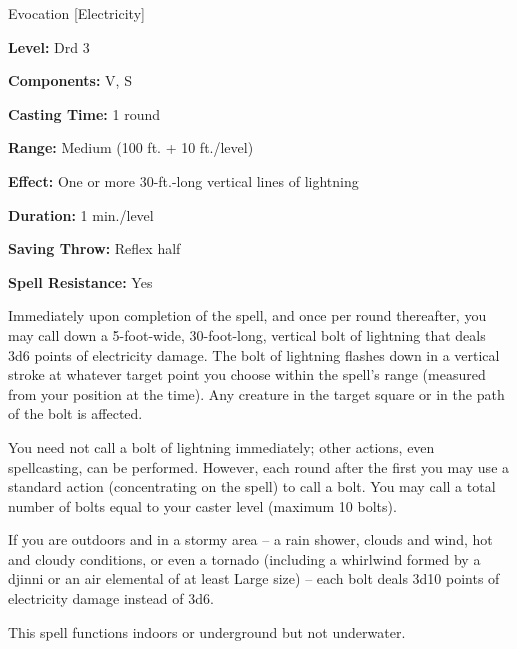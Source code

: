 
Evocation [Electricity]

\textbf{Level:} Drd 3

\textbf{Components:} V, S

\textbf{Casting Time:} 1 round

\textbf{Range:} Medium (100 ft. + 10 ft./level)

\textbf{Effect:} One or more 30-ft.-long vertical lines of lightning

\textbf{Duration:} 1 min./level

\textbf{Saving Throw:} Reflex half

\textbf{Spell Resistance:} Yes

Immediately upon completion of the spell, and once per round thereafter, you may 
call down a 5-foot-wide, 30-foot-long, vertical bolt of lightning that deals 3d6 
points of electricity damage. The bolt of lightning flashes down in a vertical 
stroke at whatever target point you choose within the spell's range (measured from 
your position at the time). Any creature in the target square or in the path of 
the bolt is affected.

You need not call a bolt of lightning immediately; other actions, even spellcasting, 
can be performed. However, each round after the first you may use a standard action 
(concentrating on the spell) to call a bolt. You may call a total number of bolts 
equal to your caster level (maximum 10 bolts).

If you are outdoors and in a stormy area -- a rain shower, clouds and wind, hot 
and cloudy conditions, or even a tornado (including a whirlwind formed by a djinni 
or an air elemental of at least Large size) -- each bolt deals 3d10 points of electricity 
damage instead of 3d6.

This spell functions indoors or underground but not underwater.

